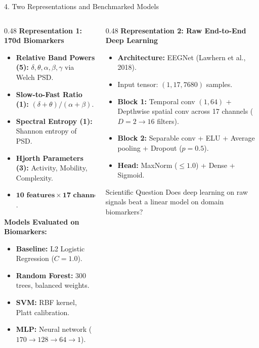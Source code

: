 \documentclass[aspectratio=169,10pt]{beamer}
\begin{document}
\begin{frame}{4. Two Representations and Benchmarked Models}
\begin{columns}[T]
\begin{column}{0.48\textwidth}
\textbf{Representation 1: 170d Biomarkers}
\begin{itemize}
    \item \textbf{Relative Band Powers (5):} $\delta, \theta, \alpha, \beta, \gamma$ via Welch PSD.
    \item \textbf{Slow-to-Fast Ratio (1):} $(\delta + \theta) / (\alpha + \beta)$.
    \item \textbf{Spectral Entropy (1):} Shannon entropy of PSD.
    \item \textbf{Hjorth Parameters (3):} Activity, Mobility, Complexity.
    \item $\mathbf{10\text{ features} \times 17\text{ channels} = 170\text{ features}}$.
\end{itemize}

\vspace{0.2cm}
\textbf{Models Evaluated on Biomarkers:}
\begin{itemize}
    \item \textbf{Baseline:} L2 Logistic Regression ($C=1.0$).
    \item \textbf{Random Forest:} $300$ trees, balanced weights.
    \item \textbf{SVM:} RBF kernel, Platt calibration.
    \item \textbf{MLP:} Neural network ($170 \to 128 \to 64 \to 1$).
\end{itemize}
\end{column}

\begin{column}{0.48\textwidth}
\textbf{Representation 2: Raw End-to-End Deep Learning}
\begin{itemize}
    \item \textbf{Architecture:} EEGNet (Lawhern et al., 2018).
    \item Input tensor: $(1, 17, 7680)$ samples.
    \item \textbf{Block 1:} Temporal conv $(1, 64)$ + Depthwise spatial conv across 17 channels ($D=2 \to 16$ filters).
    \item \textbf{Block 2:} Separable conv + ELU + Average pooling + Dropout ($p=0.5$).
    \item \textbf{Head:} MaxNorm ($\le 1.0$) + Dense + Sigmoid.
\end{itemize}

\vspace{0.2cm}
\begin{block}{Scientific Question}
Does deep learning on raw signals beat a linear model on domain biomarkers?
\end{block}
\end{column}
\end{columns}
\end{frame}
\end{document}
